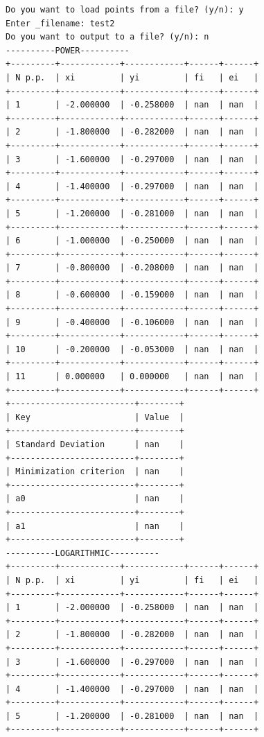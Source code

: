 \documentclass[12pt,one column]{article}
\begin{document}
\begin{verbatim}
Do you want to load points from a file? (y/n): y
Enter _filename: test2
Do you want to output to a file? (y/n): n
----------POWER----------
+---------+------------+------------+------+------+
| N p.p.  | xi         | yi         | fi   | ei   | 
+---------+------------+------------+------+------+
| 1       | -2.000000  | -0.258000  | nan  | nan  | 
+---------+------------+------------+------+------+
| 2       | -1.800000  | -0.282000  | nan  | nan  | 
+---------+------------+------------+------+------+
| 3       | -1.600000  | -0.297000  | nan  | nan  | 
+---------+------------+------------+------+------+
| 4       | -1.400000  | -0.297000  | nan  | nan  | 
+---------+------------+------------+------+------+
| 5       | -1.200000  | -0.281000  | nan  | nan  | 
+---------+------------+------------+------+------+
| 6       | -1.000000  | -0.250000  | nan  | nan  | 
+---------+------------+------------+------+------+
| 7       | -0.800000  | -0.208000  | nan  | nan  | 
+---------+------------+------------+------+------+
| 8       | -0.600000  | -0.159000  | nan  | nan  | 
+---------+------------+------------+------+------+
| 9       | -0.400000  | -0.106000  | nan  | nan  | 
+---------+------------+------------+------+------+
| 10      | -0.200000  | -0.053000  | nan  | nan  | 
+---------+------------+------------+------+------+
| 11      | 0.000000   | 0.000000   | nan  | nan  | 
+---------+------------+------------+------+------+
+-------------------------+--------+
| Key                     | Value  | 
+-------------------------+--------+
| Standard Deviation      | nan    | 
+-------------------------+--------+
| Minimization criterion  | nan    | 
+-------------------------+--------+
| a0                      | nan    | 
+-------------------------+--------+
| a1                      | nan    | 
+-------------------------+--------+
----------LOGARITHMIC----------
+---------+------------+------------+------+------+
| N p.p.  | xi         | yi         | fi   | ei   | 
+---------+------------+------------+------+------+
| 1       | -2.000000  | -0.258000  | nan  | nan  | 
+---------+------------+------------+------+------+
| 2       | -1.800000  | -0.282000  | nan  | nan  | 
+---------+------------+------------+------+------+
| 3       | -1.600000  | -0.297000  | nan  | nan  | 
+---------+------------+------------+------+------+
| 4       | -1.400000  | -0.297000  | nan  | nan  | 
+---------+------------+------------+------+------+
| 5       | -1.200000  | -0.281000  | nan  | nan  | 
+---------+------------+------------+------+------+

\end{verbatim}
\end{document}
